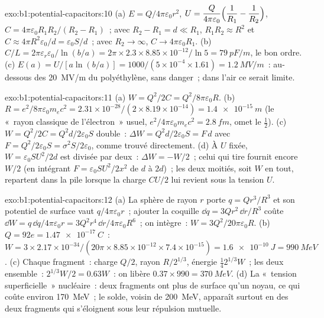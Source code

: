 \begin{solution}{exo:b1:potential-capacitors:10}
(a) $E = Q/4\pi\varepsilon_0r^2$, $U = \dfrac{Q}{4\pi\varepsilon_0}\Bigl(\dfrac1{R_1} -
\dfrac1{R_2}\Bigr)$, $C = 4\pi\varepsilon_0R_1R_2/(R_2 - R_1)$~; avec $R_2 - R_1 = d \ll
R_1$, $R_1R_2 \approx R^2$ et $C \approx 4\pi R^2\varepsilon_0/d = \varepsilon_0S/d$~; avec $R_2 \to
\infty$, $C \to 4\pi\varepsilon_0R_1$. (b) $C/L = 2\pi\varepsilon_r\varepsilon_0/\ln(b/a) = 2\pi \times 2.3
\times 8.85 \times 10^{-12}/\ln5 = \qty{79}{pF/m}$, le bon ordre. (c) $E(a) =
U/[a\ln(b/a)] = 1000/(5 \times 10^{-4} \times 1.61) = \qty{1.2}{MV/m}$~: au-dessous
des \qty{20}{MV/m} du polyéthylène, sans danger~; dans l'air ce serait limite.
\end{solution}

\begin{solution}{exo:b1:potential-capacitors:11}
(a) $W = Q^2/2C = Q^2/8\pi\varepsilon_0R$. (b) $R = e^2/8\pi\varepsilon_0m_ec^2 = 2.31 \times
10^{-28}/(2 \times 8.19 \times 10^{-14}) = \qty{1.4e-15}{m}$ (le «~rayon classique
de l'électron~» usuel, $e^2/4\pi\varepsilon_0m_ec^2 = \qty{2.8}{fm}$, omet le $\tfrac12$). (c) $W =
Q^2/2C = Q^2d/2\varepsilon_0S$ double~: $\Delta W = Q^2d/2\varepsilon_0S = F\,d$ avec $F =
Q^2/2\varepsilon_0S = \sigma^2S/2\varepsilon_0$, comme trouvé directement. (d) À $U$ fixée, $W =
\varepsilon_0SU^2/2d$ est divisée par deux~: $\Delta W = -W/2$~; celui qui tire fournit
encore $W/2$ (en intégrant $F = \varepsilon_0SU^2/2x^2$ de $d$ à $2d$)~; les deux
moitiés, soit $W$ en tout, repartent dans la pile lorsque la charge $CU/2$ lui
revient sous la tension $U$.
\end{solution}

\begin{solution}{exo:b1:potential-capacitors:12}
(a) La sphère de rayon $r$ porte $q = Qr^3/R^3$ et son potentiel de surface vaut
$q/4\pi\varepsilon_0r$~; ajouter la coquille $\dd q = 3Qr^2\,\dd r/R^3$ coûte $\dd W =
q\,\dd q/4\pi\varepsilon_0r = 3Q^2r^4\,\dd r/4\pi\varepsilon_0R^6$~; on intègre~: $W =
3Q^2/20\pi\varepsilon_0R$. (b) $Q = 92e = \qty{1.47e-17}{C}$~: $W = 3 \times 2.17 \times
10^{-34}/(20\pi \times 8.85 \times 10^{-12} \times 7.4 \times 10^{-15}) = \qty{1.6e-10}{J}
= \qty{990}{MeV}$. (c) Chaque fragment~: charge $Q/2$, rayon $R/2^{1/3}$,
énergie $\tfrac14 2^{1/3}W$~; les deux ensemble~: $2^{1/3}W/2 = 0.63W$~: on libère
$0.37 \times 990 = \qty{370}{MeV}$. (d) La «~tension superficielle~» nucléaire~:
deux fragments ont plus de surface qu'un noyau, ce qui coûte environ
\qty{170}{MeV}~; le solde, voisin de \qty{200}{MeV}, apparaît surtout en  des deux fragments qui s'éloignent sous leur répulsion
mutuelle.
\end{solution}

